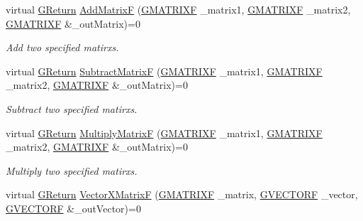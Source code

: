 \begin{DoxyCompactItemize}
\item 
virtual \mbox{\hyperlink{namespaceGW_a67a839e3df7ea8a5c5686613a7a3de21}{G\+Return}} \mbox{\hyperlink{classGW_1_1MATH_1_1GMatrix_a40f37f26a141222068d55994b8161cde}{Add\+MatrixF}} (\mbox{\hyperlink{structGW_1_1MATH_1_1GMATRIXF}{G\+M\+A\+T\+R\+I\+XF}} \+\_\+matrix1, \mbox{\hyperlink{structGW_1_1MATH_1_1GMATRIXF}{G\+M\+A\+T\+R\+I\+XF}} \+\_\+matrix2, \mbox{\hyperlink{structGW_1_1MATH_1_1GMATRIXF}{G\+M\+A\+T\+R\+I\+XF}} \&\+\_\+out\+Matrix)=0
\begin{DoxyCompactList}\small\item\em Add two specified matirxs. \end{DoxyCompactList}\item 
virtual \mbox{\hyperlink{namespaceGW_a67a839e3df7ea8a5c5686613a7a3de21}{G\+Return}} \mbox{\hyperlink{classGW_1_1MATH_1_1GMatrix_a0b744e7f36718b8cccf2423c88c43a30}{Subtract\+MatrixF}} (\mbox{\hyperlink{structGW_1_1MATH_1_1GMATRIXF}{G\+M\+A\+T\+R\+I\+XF}} \+\_\+matrix1, \mbox{\hyperlink{structGW_1_1MATH_1_1GMATRIXF}{G\+M\+A\+T\+R\+I\+XF}} \+\_\+matrix2, \mbox{\hyperlink{structGW_1_1MATH_1_1GMATRIXF}{G\+M\+A\+T\+R\+I\+XF}} \&\+\_\+out\+Matrix)=0
\begin{DoxyCompactList}\small\item\em Subtract two specified matirxs. \end{DoxyCompactList}\item 
virtual \mbox{\hyperlink{namespaceGW_a67a839e3df7ea8a5c5686613a7a3de21}{G\+Return}} \mbox{\hyperlink{classGW_1_1MATH_1_1GMatrix_a03ca7a7e5ad97849b9867d0210aa4bc0}{Multiply\+MatrixF}} (\mbox{\hyperlink{structGW_1_1MATH_1_1GMATRIXF}{G\+M\+A\+T\+R\+I\+XF}} \+\_\+matrix1, \mbox{\hyperlink{structGW_1_1MATH_1_1GMATRIXF}{G\+M\+A\+T\+R\+I\+XF}} \+\_\+matrix2, \mbox{\hyperlink{structGW_1_1MATH_1_1GMATRIXF}{G\+M\+A\+T\+R\+I\+XF}} \&\+\_\+out\+Matrix)=0
\begin{DoxyCompactList}\small\item\em Multiply two specified matirxs. \end{DoxyCompactList}\item 
virtual \mbox{\hyperlink{namespaceGW_a67a839e3df7ea8a5c5686613a7a3de21}{G\+Return}} \mbox{\hyperlink{classGW_1_1MATH_1_1GMatrix_a8e1b421243bebab184ca0237e163fa2d}{Vector\+X\+MatrixF}} (\mbox{\hyperlink{structGW_1_1MATH_1_1GMATRIXF}{G\+M\+A\+T\+R\+I\+XF}} \+\_\+matrix, \mbox{\hyperlink{structGW_1_1MATH_1_1GVECTORF}{G\+V\+E\+C\+T\+O\+RF}} \+\_\+vector, \mbox{\hyperlink{structGW_1_1MATH_1_1GVECTORF}{G\+V\+E\+C\+T\+O\+RF}} \&\+\_\+out\+Vector)=0

\end{DoxyCompactItemize}
